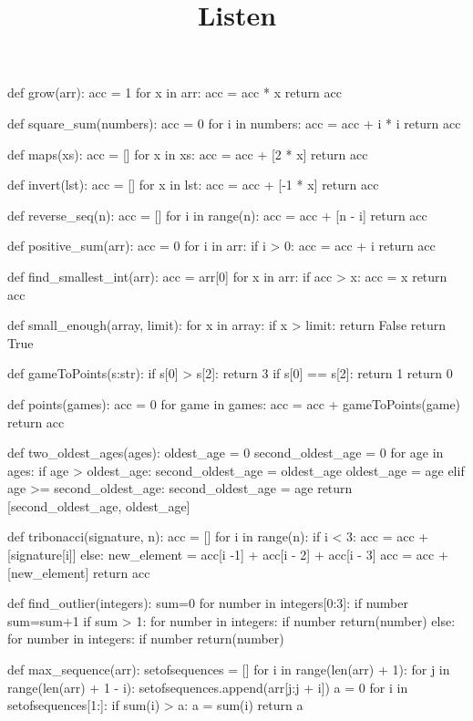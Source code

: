 \documentclass[class=scrartcl, crop=false]{standalone}
\title{Listen}
\newcommand{\expandpyconc}[1]{\expandafter\reallyexpandpyconc\expandafter{#1}}
\newcommand{\reallyexpandpyconc}[1]{\pyconc{exec(compile(open('#1', 'rb').read(), '#1', 'exec'))}}
\newenvironment{pyconcodeblck}[1]
{\newcommand{\snippetfile}{snippet-#1.py}
	\VerbatimEnvironment
	\begin{VerbatimOut}{\snippetfile}}
	{\end{VerbatimOut}
	\expandpyconc{\snippetfile}}
\begin{document}
\begin{pyconcodeblck}{listen}
def grow(arr):
    acc = 1
    for x in arr:
        acc = acc * x
    return acc

def square_sum(numbers):
    acc = 0
    for i in numbers:
        acc = acc + i * i
    return acc

def maps(xs):
    acc = []
    for x in xs:
        acc = acc + [2 * x]
    return acc

def invert(lst):
    acc = []
    for x in lst:
        acc = acc + [-1 * x]
    return acc

def reverse_seq(n):
    acc = []
    for i in range(n):
        acc = acc + [n - i]
    return acc

def positive_sum(arr):
    acc = 0
    for i in arr:
        if i > 0:
            acc = acc + i
    return acc

def find_smallest_int(arr):
    acc = arr[0]
    for x in arr:
        if acc > x:
            acc = x
    return acc

def small_enough(array, limit):
    for x in array:
        if x > limit:
            return False
    return True


def gameToPoints(s:str):
    if s[0] > s[2]:
        return 3
    if s[0] == s[2]:
        return 1
    return 0
    

def points(games):
    acc = 0
    for game in games:
        acc = acc + gameToPoints(game)
    return acc

def two_oldest_ages(ages):
    oldest_age = 0
    second_oldest_age = 0
    for age in ages:
        if age > oldest_age:
            second_oldest_age = oldest_age
            oldest_age = age
        elif age >= second_oldest_age:
            second_oldest_age = age
    return [second_oldest_age, oldest_age]


def tribonacci(signature, n):
    acc = []
    for i in range(n):
        if i < 3:
            acc = acc + [signature[i]]
        else:
            new_element = acc[i -1] + acc[i - 2] + acc[i - 3]
            acc = acc + [new_element]
    return acc
        
def find_outlier(integers):    
    sum=0
    for number in integers[0:3]:
        if number %
            sum=sum+1
    if sum > 1:
        for number in integers:
            if number %
                return(number)
    else:            
        for number in integers:
            if number %
                return(number)


def max_sequence(arr):
    setofsequences = []
    for i in range(len(arr) + 1):
        for j in range(len(arr) + 1 - i):
            setofsequences.append(arr[j:j + i])
    a = 0
    for i in setofsequences[1:]:
        if sum(i) > a:
            a = sum(i)
    return a




\end{pyconcodeblck}
\end{document}
